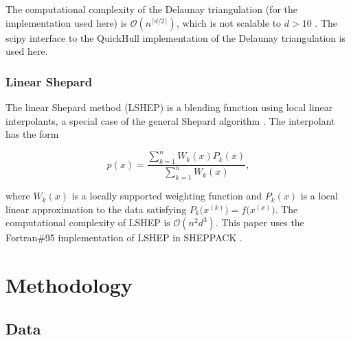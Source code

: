 \documentclass{scspaperproc}
\theoremstyle{scsthe}
\begin{document}
The computational complexity of the Delaunay triangulation (for the
implementation used here) is $\mathcal{O}(n^{\lceil d/2 \rceil})$,
which is not scalable to $d > 10$ .
The scipy interface  to the QuickHull implementation
 of the Delaunay triangulation is used here.

\subsubsection{Linear Shepard}
\vspace{-10pt}
The linear Shepard method (LSHEP) is a blending function using local
linear interpolants, a special case of the general Shepard algorithm
. The interpolant has the form

$$ p(x) = \frac{\sum_{k=1}^{n}W_k(x)P_k(x)}{\sum_{k=1}^{n}W_k(x)} ,$$

where $W_k(x)$ is a locally supported weighting function and $P_k(x)$
is a local linear approximation to the data satisfying
$P_k\big(x^{(k)}\big) = f\big(x^{(x)}\big)$. The computational
complexity of LSHEP is $\mathcal{O}(n^2d^3)$. This paper uses the
Fortran\#95 implementation of LSHEP in SHEPPACK
.


\section{Methodology}
\label{sec:methodology}
\subsection{Data}
\vspace{-10pt}
\end{document}
